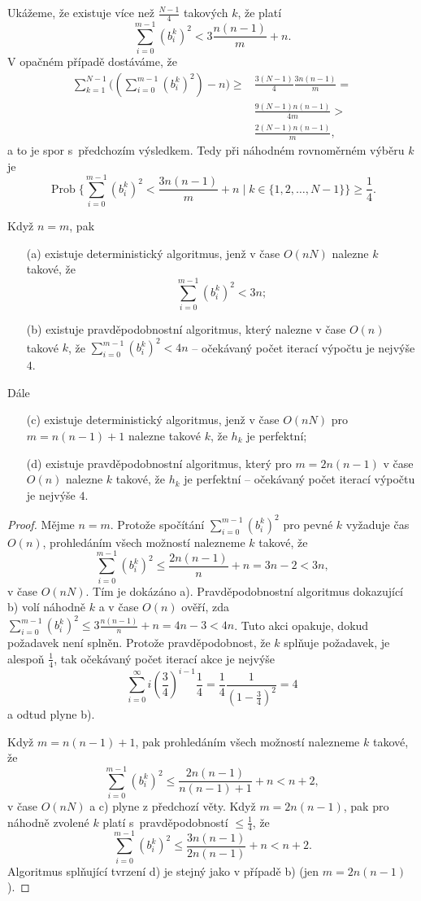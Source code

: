 \documentclass[a4paper,12pt]{article}
\DeclareMathOperator*{\Prob}{Prob}
\begin{document}
Ukážeme, že existuje více než $\frac {N-
1}4$ takových 
$k$, že platí
$$\sum_{i=0}^{m-1}(b_i^k)^2<3\frac {n(n-1)}m+n.$$
V opačném případě dostáváme, že 
\begin{align*}\sum_{k=1}^{N-1}\big((\sum_{i=0}^{m-1}(b_i^k)^2)-n\big)\ge&\frac {
3(N-1)}4\frac {3n(n-1)}m=\\
&\frac {9(N-1)n(n-1)}{4m}>\\
&\frac {2(N-1)n(n-1)}m,\end{align*}
a to je spor s~předchozím výsledkem. Tedy při náhodném rovnoměrném 
výběru $k$ je 
$$\Prob\{\sum_{i=0}^{m-1}(b_i^k)^2<\frac {3n(n-1)}m+n\mid k\in \{
1,2,\dots,N-1\}\}\ge\frac 14.$$

\begin{tvrzeni}Když $n=m$, pak 
\begin{enumerate}
\item[(a)]
existuje deterministický algoritmus, jenž v čase $O(nN)$ 
nalezne $k$ takové, že 
$$\sum_{i=0}^{m-1}(b_i^k)^2<3n;$$
\item[(b)]
existuje pravděpodobnostní algoritmus, který 
nalezne v čase $O(n)$ takové $k$, že $\sum_{i=0}^{m-1}(b_
i^k)^2<4n$ -- očekávaný počet iterací výpočtu je nejvýše $
4$.
\end{enumerate}
Dále 
\begin{enumerate}
\item[(c)]
existuje deterministický algoritmus, jenž v čase $O(nN)$ pro 
$m=n(n-1)+1$ nalezne takové $k$, že $h_k$ je 
perfektní;
\item[(d)]
existuje pravděpodobnostní algoritmus, který pro 
$m=2n(n-1)$ v čase $O(n)$ nalezne $k$ takové, že $h_k$ je 
perfektní -- očekávaný počet iterací výpočtu 
je nejvýše $4$.
\end{enumerate}
\end{tvrzeni}

\begin{proof}Mějme $n=m$. Protože spočítání 
$\sum_{i=0}^{m-1}(b_i^k)^2$ pro pevné $k$ vyžaduje čas $O
(n)$, prohledáním 
všech možností nalez\-ne\-me $k$ takové, že 
$$\sum_{i=0}^{m-1}(b_i^k)^2\le\frac {2n(n-1)}n+n=3n-2<3n,$$
v čase $O(nN)$. Tím je 
dokázáno a). Pravděpodobnostní algoritmus dokazující b) volí 
náhodně $k$ a v čase $O(n)$ ověří, zda 
$\sum_{i=0}^{m-1}(b_i^k)^2\le 3\frac {n(n-1)}n+n=4n-3<4n$. Tuto akci opakuje, dokud 
požadavek není splněn. Protože pravděpodobnost, že $
k$ splňuje 
požadavek, je alespoň $\frac 14$, tak očekávaný počet ite\-rací 
akce je nejvýše 
$$\sum_{i=0}^{\infty}i(\frac 34)^{i-1}\frac 14=\frac 14\frac 1{(1
-\frac 34)^2}=4$$
a odtud plyne b). 

Když $m=n(n-1)+1$, pak prohledáním všech možností 
nalezne\-me $k$ takové, že 
$$\sum_{i=0}^{m-1}(b_i^k)^2\le\frac {2n(n-1)}{n(n-1)+1}+n<n+2,$$
 v 
čase $O(nN)$ a c) plyne z předchozí věty. Když 
$m=2n(n-1)$, pak pro náhodně zvolené $k$ platí s~pravděpodobností $\le\frac 14$, že 
$$\sum_{i=0}^{m-1}(b_i^k)^2\le\frac {3n(n-1)}{2n(n-1)}+n<n+2.$$
Algoritmus splňující tvrzení d) je stejný jako 
v případě b) (jen $m=2n(n-1)$).
\end{proof}
\end{document}
